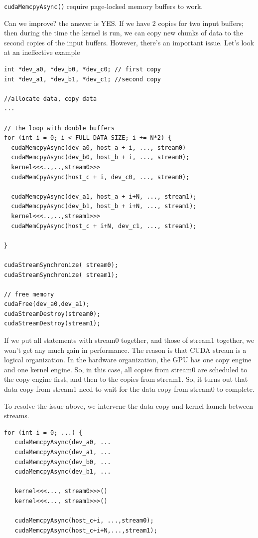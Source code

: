 \begin{framed}
\verb!cudaMemcpyAsync()! require page-locked memory buffers to work.
\end{framed}

Can we improve? the answer is YES. If we have 2 copies for two input buffers;
then during the time the kernel is run, we can copy new chunks of data to the
second copies of the input buffers. However, there's an important issue. Let's
look at an ineffective example
\begin{lstlisting}
int *dev_a0, *dev_b0, *dev_c0; // first copy
int *dev_a1, *dev_b1, *dev_c1; //second copy

//allocate data, copy data
...

// the loop with double buffers
for (int i = 0; i < FULL_DATA_SIZE; i += N*2) {
  cudaMemcpyAsync(dev_a0, host_a + i, ..., stream0)
  cudaMemcpyAsync(dev_b0, host_b + i, ..., stream0);
  kernel<<<..,..,stream0>>>
  cudaMemCpyAsync(host_c + i, dev_c0, ..., stream0);
  
  cudaMemcpyAsync(dev_a1, host_a + i+N, ..., stream1);
  cudaMemcpyAsync(dev_b1, host_b + i+N, ..., stream1);
  kernel<<<..,..,stream1>>>
  cudaMemCpyAsync(host_c + i+N, dev_c1, ..., stream1);

}

cudaStreamSynchronize( stream0);
cudaStreamSynchronize( stream1);

// free memory
cudaFree(dev_a0,dev_a1);
cudaStreamDestroy(stream0);
cudaStreamDestroy(stream1);
\end{lstlisting}
If we put all statements with stream0 together, and those of stream1 together,
we won't get any much gain in performance. The reason is that CUDA stream is a
logical organization. In the hardware organization, the GPU has one copy engine
and one kernel engine. So, in this case, all copies from stream0 are
scheduled to the copy engine first, and then to the copies from stream1. So, it
turns out that data copy from stream1 need to wait for the data copy from
stream0 to complete. 

To resolve the issue above, we intervene the data copy and kernel launch between
streams.
\begin{lstlisting}
for (int i = 0; ...) {
   cudaMemcpyAsync(dev_a0, ...
   cudaMemcpyAsync(dev_a1, ...
   cudaMemcpyAsync(dev_b0, ...
   cudaMemcpyAsync(dev_b1, ...
   
   kernel<<<..., stream0>>>()
   kernel<<<..., stream1>>>()
   
   cudaMemcpyAsync(host_c+i, ...,stream0);
   cudaMemcpyAsync(host_c+i+N,...,stream1);
\end{lstlisting}

